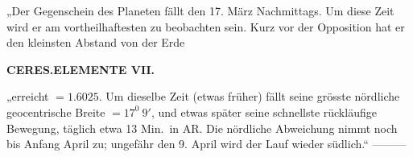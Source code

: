 „Der Gegenschein des Planeten fällt den 17. März Nachmittags. Um diese Zeit wird er am vortheilhaftesten zu beobachten sein. Kurz vor der Opposition hat er den kleinsten Abstand von der Erde\par
\clearpage
\thispagestyle{empty}
\noindent{}%
\makebox[12mm][l]{}%
\parbox[t]{\dimexpr\linewidth-24mm\relax}{\centering\footnotesize\bfseries CERES.\enspace ELEMENTE VII.\par}%
\par\nobreak\medskip
\noindent „erreicht $=1.6025$. Um dieselbe Zeit (etwas früher) fällt seine grösste nördliche geocentrische Breite $=17^0\ 9'$, und etwas später seine schnellste rückläufige Bewegung, täglich etwa 13 Min.\ in AR. Die nördliche Abweichung nimmt noch bis Anfang April zu; ungefähr den 9. April wird der Lauf wieder südlich.“ —\quad —\quad —
\begin{flushright}\end{flushright}

